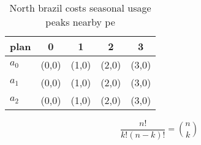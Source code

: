 \documentclass[a4paper]{article}
\begin{document}
\begin{table}
\begin{adjustbox}{width=0.6\columnwidth}
\begin{tabular}{|l|l|l|l|l|}
\hline
\textbf{plan} & \multicolumn{1}{c|}{\textbf{0}} & \multicolumn{1}{c|}{\textbf{1}} & \multicolumn{1}{c|}{\textbf{2}} & \multicolumn{1}{c|}{\textbf{3}} \\ \hline
\textbf{$a_0$}  & (0,0) & (1,0) & (2,0) & (3,0) \\ \hline
\textbf{$a_1$}  & (0,0) & (1,0) & (2,0) & (3,0) \\ \hline
\textbf{$a_2$}  & (0,0) & (1,0) & (2,0) & (3,0) \\ \hline
\end{tabular}
\end{adjustbox}
\caption{North brazil costs seasonal usage peaks nearby pe
}
\end{table}

\[ \frac{n!}{k!(n-k)!} = \binom{n}{k} \]
\end{document}
